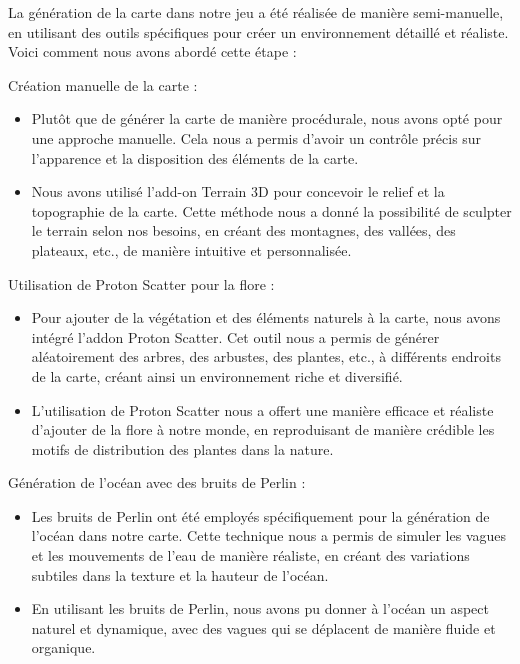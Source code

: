 \documentclass[
	article,			%
	11pt,				%
	oneside,			%
	a4paper,			%
	chapter=TITLE,
	french,			%
	sumario=tradicional
	]{base_nt}
\begin{document}
La génération de la carte dans notre jeu a été réalisée de manière semi-manuelle, en utilisant des outils spécifiques pour créer un environnement détaillé et réaliste. Voici comment nous avons abordé cette étape :

Création manuelle de la carte :

\begin{itemize}
    \item Plutôt que de générer la carte de manière procédurale, nous avons opté pour une approche manuelle. Cela nous a permis d'avoir un contrôle précis sur l'apparence et la disposition des éléments de la carte.
    \item Nous avons utilisé l'add-on Terrain 3D pour concevoir le relief et la topographie de la carte. Cette méthode nous a donné la possibilité de sculpter le terrain selon nos besoins, en créant des montagnes, des vallées, des plateaux, etc., de manière intuitive et personnalisée.
\end{itemize}

Utilisation de Proton Scatter pour la flore :

\begin{itemize}
    \item Pour ajouter de la végétation et des éléments naturels à la carte, nous avons intégré l'addon Proton Scatter. Cet outil nous a permis de générer aléatoirement des arbres, des arbustes, des plantes, etc., à différents endroits de la carte, créant ainsi un environnement riche et diversifié.
    \item L'utilisation de Proton Scatter nous a offert une manière efficace et réaliste d'ajouter de la flore à notre monde, en reproduisant de manière crédible les motifs de distribution des plantes dans la nature.
\end{itemize}

Génération de l'océan avec des bruits de Perlin :

\begin{itemize}
    \item Les bruits de Perlin ont été employés spécifiquement pour la génération de l'océan dans notre carte. Cette technique nous a permis de simuler les vagues et les mouvements de l'eau de manière réaliste, en créant des variations subtiles dans la texture et la hauteur de l'océan.
    \item En utilisant les bruits de Perlin, nous avons pu donner à l'océan un aspect naturel et dynamique, avec des vagues qui se déplacent de manière fluide et organique.
\end{itemize}
\end{document}
